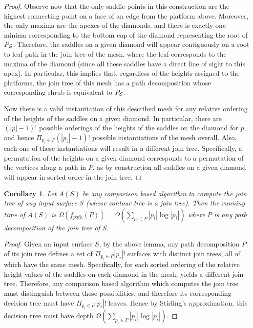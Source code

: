 \documentclass[11pt]{article}
\newtheorem{corollary}[theorem]{Corollary}
\theoremstyle{definition}
\begin{document}
\begin{proof}
 Observe now that the only saddle points in this construction are the highest connecting point on a face of an edge from the platform above.  Moreover, the only maxima are the apexes of the 
 diamonds, and there is exactly one minima corresponding to the bottom cap of the diamond representing the root of $P_{\mathcal{S}}$.  Therefore, the saddles on a given 
 diamond will appear contiguously on a root to leaf path in the join tree of the mesh, where the leaf corresponds to the maxima of the diamond 
 (since all these saddles have a direct line of sight to this apex).  In particular, 
 this implies that, regardless of the heights assigned to the platforms, the join tree of this mesh has a path decomposition whose corresponding shrub is equivalent to $P_{\mathcal{S}}$.  
 
 Now there is a valid instantiation of this described mesh for any relative ordering of the heights of the saddles on a given diamond.  In particular, 
 there are $(|p|-1)!$ possible orderings of the heights of the saddles on the diamond for $p$, and hence $\Pi_{p_i\in P} (|p_i|-1)!$ possible instantiations of 
 the mesh overall.  Also, each one of these instantiations will result in a different join tree.  Specifically, a permutation of the heights on a given diamond 
 corresponds to a permutation of the vertices along a path in $P$, as by construction all saddles on a given diamond will appear in sorted order in the join tree.
\end{proof}



\begin{corollary}
 \label{cor:joinLB}
 Let $A(S)$ be any comparison based algorithm to compute the join tree of any input surface $S$ (whose contour tree is a join tree).  
 Then the running time of $A(S)$ is $\Omega(f_{path}(P))=\Omega(\sum_{p_i\in P} |p_i|\log|p_i|)$ where $P$ is any path decomposition of the 
 join tree of $S$.
\end{corollary}
\begin{proof}
 Given an input surface $S$, by the above lemma, any path decomposition $P$ of its join tree defines a set of $\Pi_{p_i\in P} |p_i|!$ surfaces 
 with distinct join trees, all of which have the same mesh.  Specifically, for each sorted ordering of the relative height values of the saddles 
 on each diamond in the mesh, yields a different join tree.
 Therefore, any comparison based algorithm which computes the join tree must distinguish between these possibilities, and therefore its corresponding decision tree must 
 have $\Pi_{p_i\in P} |p_i|!$ leaves.  Hence by Stirling's approximation, this decision tree must have depth $\Omega(\sum_{p_i\in P} |p_i|\log|p_i|)$.
\end{proof}
\end{document}
